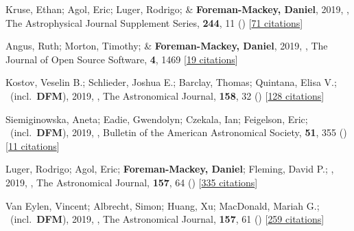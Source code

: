\item[{\color{numcolor}\scriptsize46}] Kruse, Ethan; Agol, Eric; Luger, Rodrigo; \& \textbf{Foreman-Mackey, Daniel}, 2019, , The Astrophysical Journal Supplement Series, \textbf{244}, 11 () [\href{https://ui.adsabs.harvard.edu/abs/2019ApJS..244...11K}{71 citations}]

\item[{\color{numcolor}\scriptsize45}] Angus, Ruth; Morton, Timothy; \& \textbf{Foreman-Mackey, Daniel}, 2019, , The Journal of Open Source Software, \textbf{4}, 1469 [\href{https://ui.adsabs.harvard.edu/abs/2019JOSS....4.1469A}{19 citations}]

\item[{\color{numcolor}\scriptsize44}] Kostov, Veselin B.; Schlieder, Joshua E.; Barclay, Thomas; Quintana, Elisa V.; \etal\ (incl.\ \textbf{DFM}), 2019, , The Astronomical Journal, \textbf{158}, 32 () [\href{https://ui.adsabs.harvard.edu/abs/2019AJ....158...32K}{128 citations}]

\item[{\color{numcolor}\scriptsize43}] Siemiginowska, Aneta; Eadie, Gwendolyn; Czekala, Ian; Feigelson, Eric; \etal\ (incl.\ \textbf{DFM}), 2019, , Bulletin of the American Astronomical Society, \textbf{51}, 355 () [\href{https://ui.adsabs.harvard.edu/abs/2019BAAS...51c.355S}{11 citations}]

\item[{\color{numcolor}\scriptsize42}] Luger, Rodrigo; Agol, Eric; \textbf{Foreman-Mackey, Daniel}; Fleming, David P.; \etal, 2019, , The Astronomical Journal, \textbf{157}, 64 () [\href{https://ui.adsabs.harvard.edu/abs/2019AJ....157...64L}{335 citations}]

\item[{\color{numcolor}\scriptsize41}] Van Eylen, Vincent; Albrecht, Simon; Huang, Xu; MacDonald, Mariah G.; \etal\ (incl.\ \textbf{DFM}), 2019, , The Astronomical Journal, \textbf{157}, 61 () [\href{https://ui.adsabs.harvard.edu/abs/2019AJ....157...61V}{259 citations}]

